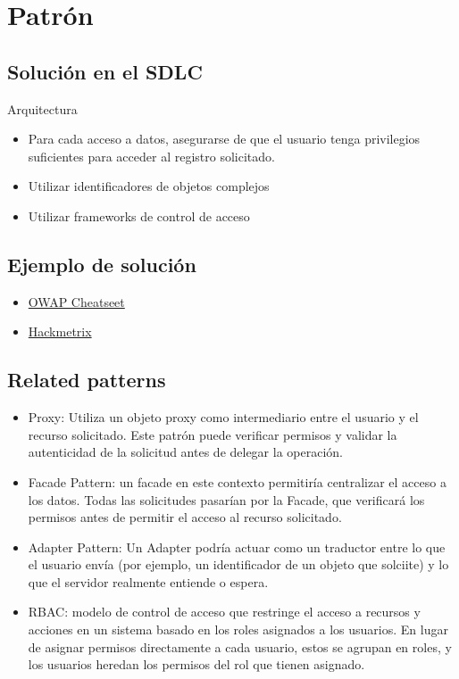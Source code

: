 \section{Patrón}
\subsection*{Solución en el SDLC}
Arquitectura
\begin{itemize}
    \item Para cada acceso a datos, asegurarse de que el usuario tenga privilegios suficientes para acceder al registro solicitado.
    \item Utilizar identificadores de objetos complejos
    \item Utilizar frameworks de control de acceso
\end{itemize}
\subsection*{Ejemplo de solución}
\begin{itemize}
    \item \href{https://cheatsheetseries.owasp.org/cheatsheets/Insecure_Direct_Object_Reference_Prevention_Cheat_Sheet.html}{OWAP Cheatseet}
    \item \href{https://blog.hackmetrix.com/insecure-direct-object-reference/}{Hackmetrix}
\end{itemize}

\subsection*{Related patterns}
\begin{itemize}
    \item Proxy: Utiliza un objeto proxy como intermediario entre el usuario y el recurso solicitado. Este patrón puede verificar permisos y validar la autenticidad de la solicitud antes de delegar la operación.
    \item Facade Pattern: un facade en este contexto permitiría centralizar el acceso a los datos. Todas las solicitudes pasarían por la Facade, que verificará los permisos antes de permitir el acceso al recurso solicitado.
    \item Adapter Pattern: Un Adapter podría actuar como un traductor entre lo que el usuario envía (por ejemplo, un identificador de un objeto que solciite) y lo que el servidor realmente entiende o espera.
    \item RBAC: modelo de control de acceso que restringe el acceso a recursos y acciones en un sistema basado en los roles asignados a los usuarios. En lugar de asignar permisos directamente a cada usuario, estos se agrupan en roles, y los usuarios heredan los permisos del rol que tienen asignado.
\end{itemize}